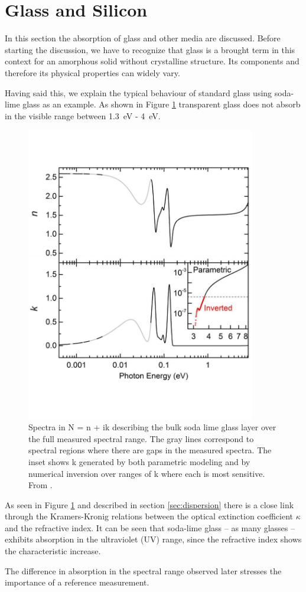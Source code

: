 \section{Glass and Silicon}
\label{sec:GlassAndSilicon}
In this section the absorption of glass and other media are discussed. Before starting the discussion, we have to 
recognize that glass is a brought term in this context for an amorphous solid without crystalline structure.
Its components and therefore its physical properties can widely vary.

Having said this, we explain the typical behaviour of standard glass using soda-lime glass as an example. As shown 
in Figure \ref{fig:SodaLimeGlass} transparent glass does not absorb in the visible range between \SI{1.3}{eV} - \SI{4}{eV}.

\begin{figure}[ht]
    \centering
    \includegraphics[width = 10cm]{Bilder/Grundlagen/SodalimePic.pdf}
    \caption{Spectra in N = n + ik describing the bulk soda lime glass layer over the full measured spectral range. The
    gray lines correspond to spectral regions where there are gaps in the measured spectra. The inset shows k generated
    by both parametric modeling and by numerical inversion over ranges of k where each is most sensitive. From \cite[]{Junda.2018}.}
    \label{fig:SodaLimeGlass}
\end{figure}

As seen in Figure \ref{fig:SodaLimeGlass} and described in section \ref{sec:dispersion} there is a close link through the Kramers-Kronig relations
between the optical extinction coefficient $\kappa$ and the refractive index. It can be seen 
that soda-lime glass -- as many glasses -- exhibits absorption in the ultraviolet (UV) range, since the refractive index 
shows the characteristic increase.  

The difference in absorption in the spectral range observed later stresses the importance of a reference measurement.
